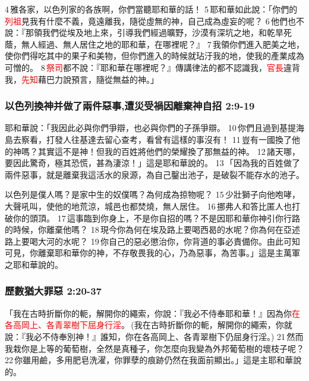 4 雅各家，以色列家的各族啊，你們當聽耶和華的話！ 5 耶和華如此說：「你們的\textcolor{red}{列祖}見我有什麼不義，竟遠離我，隨從虛無的神，自己成為虛妄的呢？ 6 他們也不說：『那領我們從埃及地上來，引導我們經過曠野，沙漠有深坑之地，和乾旱死蔭，無人經過、無人居住之地的耶和華，在哪裡呢？』 7 我領你們進入肥美之地，使你們得吃其中的果子和美物，但你們進入的時候就玷汙我的地，使我的產業成為可憎的。 8 \textcolor{red}{祭司}都不說：『耶和華在哪裡呢？』傳講律法的都不認識我，\textcolor{red}{官長}違背我，\textcolor{red}{先知}藉巴力說預言，隨從無益的神。」

\subsubsection{以色列換神并做了兩件惡事,遭災受禍因離棄神自招 2:9-19}
耶和華說：「我因此必與你們爭辯，也必與你們的子孫爭辯。 10 你們且過到基提海島去察看，打發人往基達去留心查考，看曾有這樣的事沒有！ 11 豈有一國換了他的神嗎？其實這不是神！但我的百姓將他們的榮耀換了那無益的神。 12 諸天哪，要因此驚奇，極其恐慌，甚為淒涼！」這是耶和華說的。 13 「因為我的百姓做了兩件惡事，就是離棄我這活水的泉源，為自己鑿出池子，是破裂不能存水的池子。


以色列是僕人嗎？是家中生的奴僕嗎？為何成為掠物呢？ 15 少壯獅子向他咆哮，大聲吼叫，使他的地荒涼，城邑也都焚燒，無人居住。 16 挪弗人和答比匿人也打破你的頭頂。 17 這事臨到你身上，不是你自招的嗎？不是因耶和華你神引你行路的時候，你離棄他嗎？ 18 現今你為何在埃及路上要喝西曷的水呢？你為何在亞述路上要喝大河的水呢？ 19 你自己的惡必懲治你，你背道的事必責備你。由此可知可見，你離棄耶和華你的神，不存敬畏我的心，乃為惡事，為苦事。」這是主萬軍之耶和華說的。

\subsubsection{歷數猶大罪惡 2:20-37}
「我在古時折斷你的軛，解開你的繩索，你說：『我必不侍奉耶和華！』因為你\textcolor{red}{在各高岡上、各青翠樹下屈身行淫}。 (我在古時折斷你的軛，解開你的繩索，你就說：『我必不侍奉別神！』誰知，你在各高岡上、各青翠樹下仍屈身行淫。) 21 然而我栽你是上等的葡萄樹，全然是真種子，你怎麼向我變為外邦葡萄樹的壞枝子呢？ 22 你雖用鹼，多用肥皂洗濯，你罪孽的痕跡仍然在我面前顯出。」這是主耶和華說的。 

